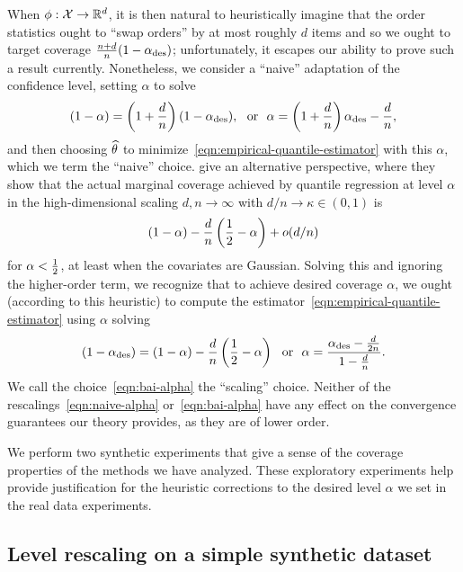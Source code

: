 \documentclass{article}
\begin{document}
When $\phi : \mathcal{X} \to \mathbb{R}^d$, it is then natural to heuristically imagine
that the order statistics ought to ``swap orders'' by at most roughly $d$
items and so we ought to target coverage $\frac{n + d}{n}(1 -
\alpha_{\textup{des}})$; unfortunately, it escapes our ability to prove such a
result currently.
%
Nonetheless, we consider a ``naive'' adaptation of the confidence level,
setting $\alpha$ to solve
\begin{equation}
  \label{eqn:naive-alpha}
  (1 - \alpha) = \left(1 + \frac{d}{n}\right) (1 - \alpha_{\textup{des}}),
  ~~ \mbox{or} ~~
  \alpha = \left(1 + \frac{d}{n}\right) \alpha_{\textup{des}} - \frac{d}{n},
\end{equation}
and then choosing $\widehat{\theta}$ to
minimize~\eqref{eqn:empirical-quantile-estimator} with this $\alpha$,
which we term the ``naive'' choice.
%
\citet{BaiMeWaXi21} give an alternative perspective, where they show
that the actual marginal coverage achieved by quantile regression
at level $\alpha$ in the high-dimensional scaling $d, n \to \infty$ with
$d/n \to \kappa \in (0, 1)$ is
\begin{equation*}
  (1 - \alpha) - \frac{d}{n} \left(\frac{1}{2} - \alpha\right) + o(d/n)
\end{equation*}
for $\alpha < \frac{1}{2}$, at least when the covariates are Gaussian.
%
Solving this and ignoring the higher-order term, we recognize that to
achieve desired coverage $\alpha$, we ought (according to this heuristic) to
compute the estimator~\eqref{eqn:empirical-quantile-estimator} using
$\alpha$ solving
\begin{equation}
  \label{eqn:bai-alpha}
  (1 - \alpha_{\textup{des}}) = (1 - \alpha) - \frac{d}{n}
  \left(\frac{1}{2} - \alpha\right)
  ~~ \mbox{or} ~~
  \alpha = \frac{\alpha_{\textup{des}} - \frac{d}{2n}}{1 - \frac{d}{n}}.
\end{equation}
We call the choice~\eqref{eqn:bai-alpha} the ``scaling'' choice.
%
Neither of the rescalings~\eqref{eqn:naive-alpha} or~\eqref{eqn:bai-alpha}
have any effect on the convergence guarantees our theory provides, as they
are of lower order.

We perform two synthetic experiments that give a
sense of the coverage properties of the methods we have analyzed.
%
These exploratory experiments help provide justification for the heuristic
corrections to the desired level $\alpha$ we set in the real data
experiments.

\subsection{Level rescaling on a simple synthetic dataset}
\end{document}
